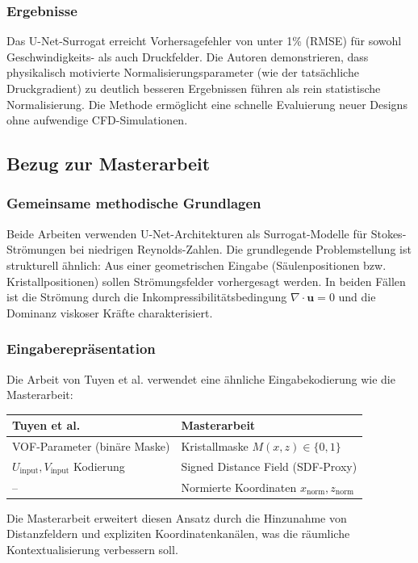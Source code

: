 \documentclass[a4paper,12pt]{article}
\begin{document}
\subsubsection*{Ergebnisse}

Das U-Net-Surrogat erreicht Vorhersagefehler von unter 1\% (RMSE) für sowohl Geschwindigkeits- als auch Druckfelder. Die Autoren demonstrieren, dass physikalisch motivierte Normalisierungsparameter (wie der tatsächliche Druckgradient) zu deutlich besseren Ergebnissen führen als rein statistische Normalisierung. Die Methode ermöglicht eine schnelle Evaluierung neuer Designs ohne aufwendige CFD-Simulationen.

\subsection*{Bezug zur Masterarbeit}

\subsubsection*{Gemeinsame methodische Grundlagen}

Beide Arbeiten verwenden U-Net-Architekturen als Surrogat-Modelle für Stokes-Strömungen bei niedrigen Reynolds-Zahlen. Die grundlegende Problemstellung ist strukturell ähnlich: Aus einer geometrischen Eingabe (Säulenpositionen bzw. Kristallpositionen) sollen Strömungsfelder vorhergesagt werden. In beiden Fällen ist die Strömung durch die Inkompressibilitätsbedingung $\nabla \cdot \mathbf{u} = 0$ und die Dominanz viskoser Kräfte charakterisiert.

\subsubsection*{Eingaberepräsentation}

Die Arbeit von Tuyen et al. verwendet eine ähnliche Eingabekodierung wie die Masterarbeit:
\begin{center}
\begin{tabular}{l|l}
\textbf{Tuyen et al.} & \textbf{Masterarbeit} \\
\hline
VOF-Parameter (binäre Maske) & Kristallmaske $M(x,z) \in \{0,1\}$ \\
$U_{\text{input}}, V_{\text{input}}$ Kodierung & Signed Distance Field (SDF-Proxy) \\
-- & Normierte Koordinaten $x_{\text{norm}}, z_{\text{norm}}$ \\
\end{tabular}
\end{center}
Die Masterarbeit erweitert diesen Ansatz durch die Hinzunahme von Distanzfeldern und expliziten Koordinatenkanälen, was die räumliche Kontextualisierung verbessern soll.
\end{document}

